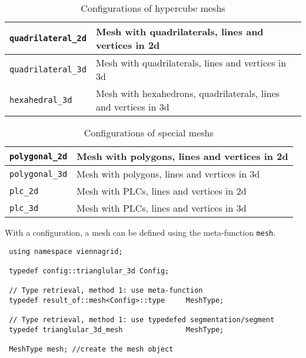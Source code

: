 \begin{table}[tb]
  \begin{center}
    \begin{tabular}{|l|l|}
      \hline
      \lstinline|quadrilateral_2d|   &  Mesh with quadrilaterals, lines and vertices in 2d  \\
      \hline
      \lstinline|quadrilateral_3d|   &  Mesh with quadrilaterals, lines and vertices in 3d  \\
      \hline
      \lstinline|hexahedral_3d|   &  Mesh with hexahedrons, quadrilaterals, lines and vertices in 3d  \\
      \hline
    \end{tabular}
    \caption{Configurations of hypercube meshs}
    \label{tab:configs-hypercube}
  \end{center}
\end{table}


\begin{table}[tb]
  \begin{center}
    \begin{tabular}{|l|l|}
      \hline
      \lstinline|polygonal_2d|   &  Mesh with polygons, lines and vertices in 2d  \\
      \hline
      \lstinline|polygonal_3d|   &  Mesh with polygons, lines and vertices in 3d  \\
      \hline
      \lstinline|plc_2d|   &  Mesh with PLCs, lines and vertices in 2d  \\
      \hline
      \lstinline|plc_3d|   &  Mesh with PLCs, lines and vertices in 3d  \\
      \hline
    \end{tabular}
    \caption{Configurations of special meshs}
    \label{tab:configs-special}
  \end{center}
\end{table}

\pagebreak

With a configuration, a mesh can be defined using the meta-function \lstinline|mesh|.

\begin{lstlisting}
 using namespace viennagrid;

 typedef config::trianglular_3d Config;

 // Type retrieval, method 1: use meta-function
 typedef result_of::mesh<Config>::type     MeshType;

 // Type retrieval, method 1: use typedefed segmentation/segment
 typedef trianglular_3d_mesh               MeshType;

 MeshType mesh; //create the mesh object
\end{lstlisting}

